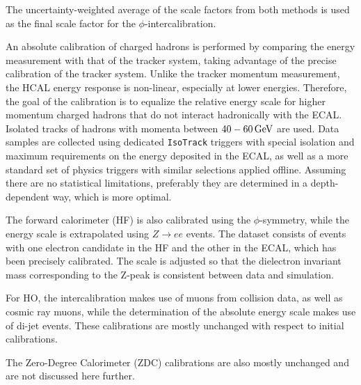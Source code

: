 The uncertainty-weighted average of the scale factors from both methods is used as the final scale factor for the $\phi$-intercalibration.

An absolute calibration of charged hadrons is performed by comparing the energy measurement with that of the tracker system, taking advantage of the precise calibration of the tracker system. Unlike the tracker momentum measurement, the HCAL energy response is non-linear, especially at lower energies. Therefore, the goal of the calibration is to equalize the relative energy scale for higher momentum charged hadrons that do not interact hadronically with the ECAL. Isolated tracks of hadrons with momenta between $40-60 \,\text{Ge\hspace{-.08em}V}$ are used. Data samples are collected using dedicated \texttt{IsoTrack} triggers with special isolation and maximum requirements on the energy deposited in the ECAL, as well as a more standard set of physics triggers with similar selections applied offline. Assuming there are no statistical limitations, preferably they are determined in a depth-dependent way, which is more optimal.

The forward calorimeter (HF) is also calibrated using the $\phi$-symmetry, while the energy scale is extrapolated using $Z \rightarrow ee$ events. The dataset consists of events with one electron candidate in the HF and the other in the ECAL, which has been precisely calibrated. The scale is adjusted so that the dielectron invariant mass corresponding to the Z-peak is consistent between data and simulation.

For HO, the intercalibration makes use of muons from collision data, as well as cosmic ray muons, while the determination of the absolute energy scale makes use of di-jet events. These calibrations are mostly unchanged with respect to initial calibrations.

The Zero-Degree Calorimeter (ZDC) calibrations are also mostly unchanged and are not discussed here further. 

